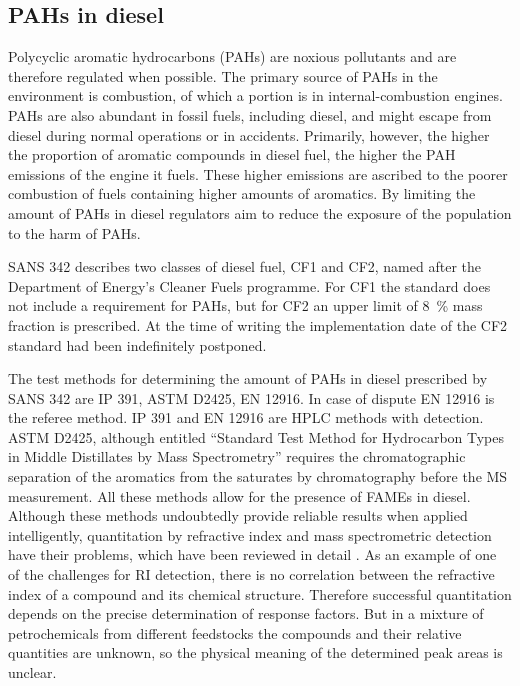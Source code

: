 \subsection{PAHs in diesel} 

Polycyclic aromatic hydrocarbons (PAHs) are noxious pollutants and are therefore
regulated when possible. The primary source of PAHs in the environment is
combustion, of which a portion is in internal-combustion engines. PAHs are also
abundant in fossil fuels, including diesel, and might escape from diesel during
normal operations or in accidents. Primarily, however, the higher the proportion
of aromatic compounds in diesel fuel, the higher the PAH emissions of the engine
it fuels. These higher emissions are ascribed to the poorer combustion of fuels
containing higher amounts of aromatics. By limiting the amount of PAHs in diesel
regulators aim to reduce the exposure of the population to the harm of PAHs.

SANS 342 describes two classes of diesel fuel, CF1 and CF2, named after the
Department of Energy's Cleaner Fuels programme. For CF1 the standard does not
include a requirement for PAHs, but for CF2 an upper limit of \SI{8}{\percent}
mass fraction is prescribed. At the time of writing the implementation date of
the CF2 standard had been indefinitely postponed. 

The test methods for determining the amount of PAHs in diesel prescribed by SANS
342 are IP 391, ASTM D2425, EN 12916. In case of dispute EN 12916 is the referee
method. IP 391 and  EN 12916 are HPLC methods with 
detection. ASTM D2425, although entitled ``Standard Test Method for Hydrocarbon
Types in Middle Distillates by Mass Spectrometry'' requires the chromatographic
separation of the aromatics from the saturates by chromatography before the MS
measurement. All these methods allow for the presence of FAMEs in diesel.
Although these methods undoubtedly provide reliable results when applied
intelligently, quantitation by refractive index and mass spectrometric detection
have their problems, which have been reviewed in detail \autocite{Kaminski2005}.
As an example of one of the challenges for RI detection, there is no correlation
between the refractive index of a compound and its chemical structure. Therefore
successful quantitation depends on the precise determination of response
factors. But in a mixture of petrochemicals from different feedstocks the
compounds and their relative quantities are unknown, so the physical meaning of
the determined peak areas is unclear.

